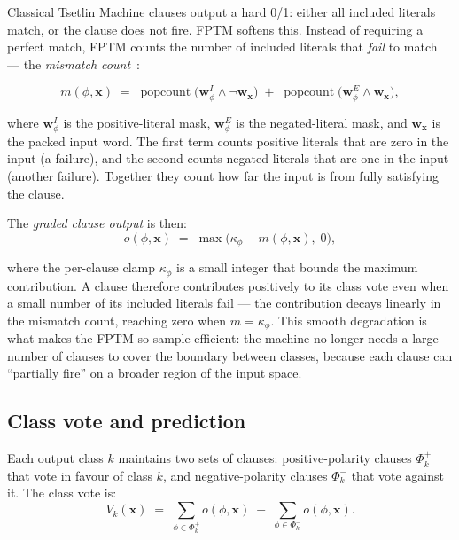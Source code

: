 \documentclass[journal,10pt]{IEEEtran}
\begin{document}
Classical Tsetlin Machine clauses output a hard 0/1: either all
included literals match, or the clause does not fire. FPTM softens
this. Instead of requiring a perfect match, FPTM counts the number
of included literals that \emph{fail} to match --- the
\emph{mismatch count}~\cite{hnilov2025fuzzy}:

\begin{equation}
  m(\phi,\mathbf{x})
  \;=\; \operatorname{popcount}\!\bigl(
        \mathbf{w}^{I}_{\phi} \wedge \neg\mathbf{w}_\mathbf{x}\bigr)
  \;+\; \operatorname{popcount}\!\bigl(
        \mathbf{w}^{E}_{\phi} \wedge \mathbf{w}_\mathbf{x}\bigr),
  \label{eq:mismatch}
\end{equation}

\noindent where $\mathbf{w}^{I}_{\phi}$ is the positive-literal mask,
$\mathbf{w}^{E}_{\phi}$ is the negated-literal mask, and
$\mathbf{w}_\mathbf{x}$ is the packed input word. The first term
counts positive literals that are zero in the input (a failure), and
the second counts negated literals that are one in the input (another
failure). Together they count how far the input is from fully
satisfying the clause.

The \emph{graded clause output} is then:
\begin{equation}
  o(\phi,\mathbf{x})
  \;=\; \max\!\bigl(\kappa_\phi - m(\phi,\mathbf{x}),\; 0\bigr),
  \label{eq:graded}
\end{equation}

\noindent where the per-clause clamp $\kappa_\phi$ is a small integer
that bounds the maximum contribution. A clause therefore contributes
positively to its class vote even when a small number of its included
literals fail --- the contribution decays linearly in the mismatch
count, reaching zero when $m = \kappa_\phi$. This smooth degradation
is what makes the FPTM so sample-efficient: the machine no longer
needs a large number of clauses to cover the boundary between classes,
because each clause can ``partially fire'' on a broader region of
the input space.

\subsection{Class vote and prediction}
\label{sec:fptm-vote}

Each output class $k$ maintains two sets of clauses: positive-polarity
clauses $\Phi_k^{+}$ that vote in favour of class $k$, and
negative-polarity clauses $\Phi_k^{-}$ that vote against it. The
class vote is:
\begin{equation}
  V_k(\mathbf{x})
  \;=\; \sum_{\phi\in\Phi_k^{+}} o(\phi,\mathbf{x})
  \;-\; \sum_{\phi\in\Phi_k^{-}} o(\phi,\mathbf{x}).
  \label{eq:vote}
\end{equation}
\end{document}
